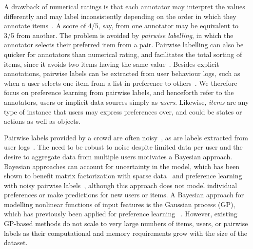 A drawback of numerical ratings is that 
each annotator may interpret the values differently and may label inconsistently depending on the order in which they annotate items~\citep{ovadia2004ratings,yannakakis2011ranking}.
A score of 4/5, say, from one annotator may be equivalent to 3/5 from another. 
The problem is avoided by \emph{pairwise labelling}, 
in which the annotator selects their preferred item from a pair.
Pairwise labelling can also be quicker for annotators than numerical rating,
and facilitates the total sorting of items, since it avoids two items having the same value~\citep{kendall1948rank,kingsley2010preference,yang2011ranking}.
Besides explicit annotations, pairwise labels can be extracted from
user behaviour logs, such as when a user selects one item from a list in preference
to others~\citep{joachims2002optimizing}. 
We therefore focus on preference learning from pairwise labels,
and henceforth refer to the annotators, users or implicit data sources simply as \emph{users}.
Likewise, \emph{items} are any type of instance that users may express preferences over,
and could be states or actions as well as objects.

Pairwise labels provided by a crowd are often noisy~\citep{chen2013pairwise}, 
as are labels extracted from user logs~\citep{hu2008collaborative}.
The need to be robust to noise despite limited data per user
and the desire to aggregate data from multiple users
motivates a Bayesian approach.
Bayesian approaches can account for uncertainty in the model,
which has been shown to benefit matrix factorization with sparse data~\citep{salakhutdinov2008bayesian}
and preference learning with noisy pairwise labels~\citep{chen2013pairwise},
although this approach does not model individual preferences or make predictions for new users or items.
A Bayesian approach for modelling nonlinear functions of input features is the Gaussian process (GP),
which has previously been applied for preference learning
~\citep{chu2005preference,houlsby2012collaborative,khan2014scalable}.
However, existing GP-based methods do not scale to very large numbers of items, users, or
pairwise labels as their computational and memory requirements grow with the size of the dataset.

